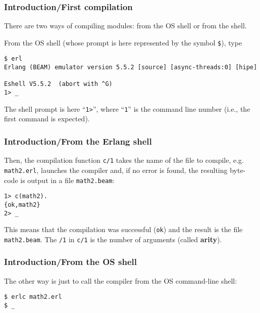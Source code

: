 %
\begin{frame}[containsverbatim]
\frametitle{Introduction/First compilation}

There are two ways of compiling \Erlang modules: from the OS shell or
from the \Erlang shell.


From the OS shell (whose prompt is here represented by the symbol
\texttt{\$}), type
{\scriptsize
\begin{verbatim}
$ erl
Erlang (BEAM) emulator version 5.5.2 [source] [async-threads:0] [hipe]

Eshell V5.5.2  (abort with ^G)
1> _
\end{verbatim}
}
The \Erlang shell prompt is here ``\texttt{1>}'', where ``\texttt{1}''
is the command line number (i.e., the first command is expected).

\end{frame}

%
\begin{frame}[containsverbatim]
\frametitle{Introduction/From the Erlang shell}
\label{arity}

Then, the compilation function \texttt{c/1} takes the name of the
file to compile, e.g. \texttt{math2.erl}, launches the compiler and,
if no error is found, the resulting byte-code is output in a file
\texttt{math2.beam}:
\begin{verbatim}
1> c(math2).
{ok,math2}
2> _
\end{verbatim}
This means that the compilation was successful (\texttt{ok}) and the
result is the file \texttt{math2.beam}. The \texttt{/1} in
\texttt{c/1} is the number of arguments (called \textbf{arity}).

\end{frame}

%
\begin{frame}[containsverbatim]
\frametitle{Introduction/From the OS shell}

The other way is just to call the \Erlang compiler from the OS
command-line shell:
\begin{verbatim}
$ erlc math2.erl 
$ _
\end{verbatim}

\end{frame}

